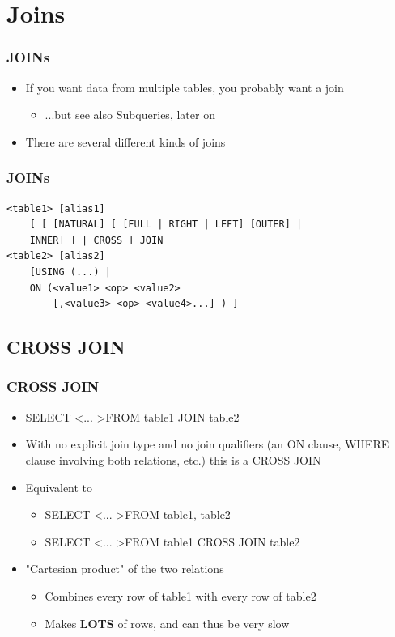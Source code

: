\documentclass{beamer}
\begin{document}
\section{Joins}

\begin{frame}
    \frametitle{JOINs}
    \begin{itemize}
        \item If you want data from multiple tables, you probably want a join
        \pause
        \begin{itemize}
            \item ...but see also Subqueries, later on
            \pause
        \end{itemize}
        \item There are several different kinds of joins
    \end{itemize}
\end{frame}

\begin{frame}[fragile]
    \frametitle{JOINs}
    \begin{verbatim}
<table1> [alias1]
    [ [ [NATURAL] [ [FULL | RIGHT | LEFT] [OUTER] |
    INNER] ] | CROSS ] JOIN
<table2> [alias2]
    [USING (...) |
    ON (<value1> <op> <value2>
        [,<value3> <op> <value4>...] ) ]
    \end{verbatim}
\end{frame}

\subsection{CROSS JOIN}

\begin{frame}
    \frametitle{CROSS JOIN}
    \begin{itemize}
        \item SELECT \textless ... \textgreater FROM table1 JOIN table2
        \pause
        \item With no explicit join type and no join qualifiers (an ON clause, WHERE clause involving both relations, etc.) this is a CROSS JOIN
        \pause
        \item Equivalent to
        \begin{itemize}
            \item SELECT \textless ... \textgreater FROM table1, table2
            \pause
            \item SELECT \textless ... \textgreater FROM table1 CROSS JOIN table2
            \pause
        \end{itemize}
        \item "Cartesian product" of the two relations
        \pause
        \begin{itemize}
            \item Combines every row of table1 with every row of table2
            \pause
            \item Makes \textbf{LOTS} of rows, and can thus be very slow
        \end{itemize}
    \end{itemize}
\end{frame}
\end{document}
